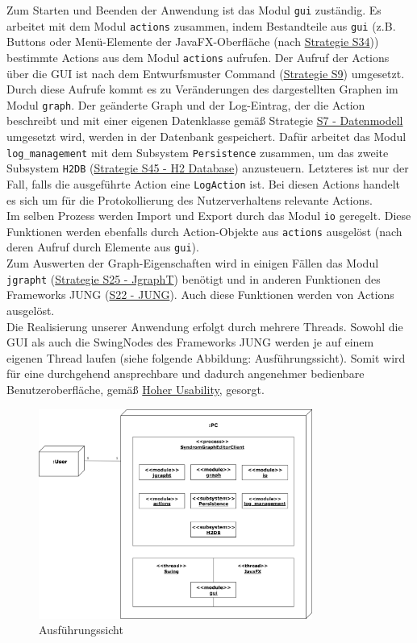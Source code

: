 \documentclass[enabledeprecatedfontcommands,fontsize=11pt,paper=a4,twoside]{scrartcl}
\newcounter{one}
\begin{document}
Zum Starten und Beenden der Anwendung ist das Modul \texttt{gui} zuständig. Es arbeitet mit dem Modul \texttt{actions} zusammen, indem Bestandteile aus \texttt{gui} (z.B. Buttons oder Menü-Elemente der JavaFX-Oberfläche (nach \hyperlink{kkk}{Strategie S34})) bestimmte Actions aus dem Modul \texttt{actions} aufrufen. Der Aufruf der Actions über die GUI ist nach dem Entwurfsmuster Command (\hyperlink{command}{Strategie S9}) umgesetzt. Durch diese Aufrufe kommt es zu Veränderungen des dargestellten Graphen im Modul \texttt{graph}. Der geänderte Graph und der Log-Eintrag, der die Action beschreibt und mit einer eigenen Datenklasse gemäß Strategie \hyperlink{aaa}{S7 - Datenmodell} umgesetzt wird, werden in der Datenbank gespeichert. Dafür arbeitet das Modul \texttt{log\_management} mit dem Subsystem \texttt{Persistence} zusammen, um das zweite Subsystem \texttt{H2DB} (\hyperlink{ppp}{Strategie S45 - H2 Database}) anzusteuern. Letzteres ist nur der Fall, falls die ausgeführte Action eine \texttt{LogAction} ist. Bei diesen Actions handelt es sich um für die Protokollierung des Nutzerverhaltens relevante Actions.\\
Im selben Prozess werden Import und Export durch das Modul \texttt{io} geregelt. Diese Funktionen werden ebenfalls durch Action-Objekte aus \texttt{actions} ausgelöst (nach deren Aufruf durch Elemente aus \texttt{gui}). \\
Zum Auswerten der Graph-Eigenschaften wird in einigen Fällen das Modul \texttt{jgrapht} (\hyperlink{xxx}{Strategie S25 - JgraphT}) benötigt und in anderen Funktionen des Frameworks JUNG (\hyperlink{fff}{S22 - JUNG}). Auch diese Funktionen werden von Actions ausgelöst.\\

Die Realisierung unserer Anwendung erfolgt durch mehrere Threads. Sowohl die GUI als auch die SwingNodes des Frameworks JUNG werden je auf einem eigenen Thread laufen (siehe folgende Abbildung: Ausführungssicht). Somit wird für eine durchgehend ansprechbare und dadurch angenehmer bedienbare Benutzeroberfläche, gemäß \hyperlink{g}{Hoher Usability}, gesorgt.\\


\begin{figure}[ht]
	\begin{center}
		\includegraphics[width=0.8\textwidth]{Ausfuehrungssicht.png}
		\caption{Ausführungssicht}
	\end{center}
\end{figure}
\clearpage
\newpage
\end{document}
